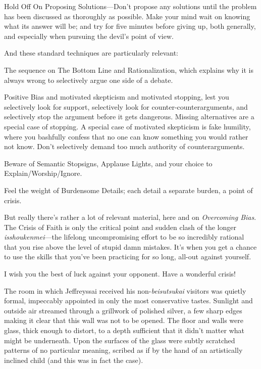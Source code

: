{
 Hold Off On Proposing Solutions---Don't propose
any solutions until the problem has been discussed as thoroughly as
possible. Make your mind wait on knowing what its answer will be; and
try for five minutes before giving up, both generally, and especially
when pursuing the devil's point of view.}

{
 And these standard techniques are particularly relevant:}

{
 The sequence on The Bottom Line and Rationalization, which
explains why it is always wrong to selectively argue one side of a
debate.}

{
 Positive Bias and motivated skepticism and motivated stopping,
lest you selectively look for support, selectively look for
counter-counterarguments, and selectively stop the argument before it
gets dangerous. Missing alternatives are a special case of stopping. A
special case of motivated skepticism is fake humility, where you
bashfully confess that no one can know something you would rather not
know. Don't selectively demand too much authority of
counterarguments.}

{
 Beware of Semantic Stopsigns, Applause Lights, and your choice to
Explain/Worship/Ignore.}

{
 Feel the weight of Burdensome Details; each detail a separate
burden, a point of crisis.}

{
 But really there's rather a lot of relevant
material, here and on \textit{Overcoming Bias}. The Crisis of Faith is
only the critical point and sudden clash of the longer
\textit{isshoukenmei}{}---the lifelong uncompromising effort to be so
incredibly rational that you rise above the level of stupid damn
mistakes. It's when you get a chance to use the skills
that you've been practicing for so long, all-out
against yourself.}

{
 I wish you the best of luck against your opponent. Have a
wonderful crisis!}

\myendsectiontext


{
 The room in which Jeffreyssai received his
non-\textit{beisutsukai} visitors was quietly formal, impeccably
appointed in only the most conservative tastes. Sunlight and outside
air streamed through a grillwork of polished silver, a few sharp edges
making it clear that this wall was not to be opened. The floor and
walls were glass, thick enough to distort, to a depth sufficient that
it didn't matter what might be underneath. Upon the
surfaces of the glass were subtly scratched patterns of no particular
meaning, scribed as if by the hand of an artistically inclined child
(and this was in fact the case). }

